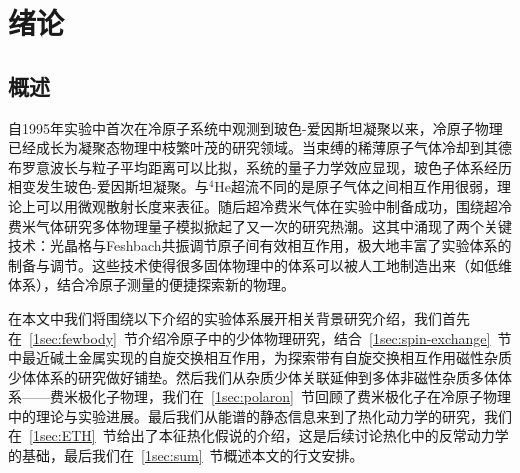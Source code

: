 \chapter{绪论}\label{chap:intro}



\section{概述}

自1995年实验中首次在冷原子系统中观测到玻色-爱因斯坦凝聚\cite{anderson1995observation,davis1995bose,Bradley1995evidence}以来，冷原子物理已经成长为凝聚态物理中枝繁叶茂的研究领域。当束缚的稀薄原子气体冷却到其德布罗意波长与粒子平均距离可以比拟，系统的量子力学效应显现，玻色子体系经历相变发生玻色-爱因斯坦凝聚。与${}^4$He超流不同的是原子气体之间相互作用很弱，理论上可以用微观散射长度来表征\cite{Dalfovo1999theory,Fetter2009rotating,pethick2008bose,pitaevskii2003bose}。随后超冷费米气体在实验中制备成功，围绕超冷费米气体研究多体物理量子模拟掀起了又一次的研究热潮\cite{Giorgini2008theory}。这其中涌现了两个关键技术：光晶格\cite{Bloch2008many}与Feshbach共振调节原子间有效相互作用\cite{Chin2010feshbach}，极大地丰富了实验体系的制备与调节。这些技术使得很多固体物理中的体系可以被人工地制造出来（如低维体系\cite{Cazalilla2011one,Guan2013fermi}），结合冷原子测量的便捷探索新的物理。

在本文中我们将围绕以下介绍的实验体系展开相关背景研究介绍，我们首先在~\ref{1sec:fewbody}~节介绍冷原子中的少体物理研究，结合~\ref{1sec:spin-exchange}~节中最近碱土金属实现的自旋交换相互作用，为探索带有自旋交换相互作用磁性杂质少体体系的研究做好铺垫。然后我们从杂质少体关联延伸到多体非磁性杂质多体体系——费米极化子物理，我们在~\ref{1sec:polaron}~节回顾了费米极化子在冷原子物理中的理论与实验进展。最后我们从能谱的静态信息来到了热化动力学的研究，我们在~\ref{1sec:ETH}~节给出了本征热化假说的介绍，这是后续讨论热化中的反常动力学的基础，最后我们在~\ref{1sec:sum}~节概述本文的行文安排。





